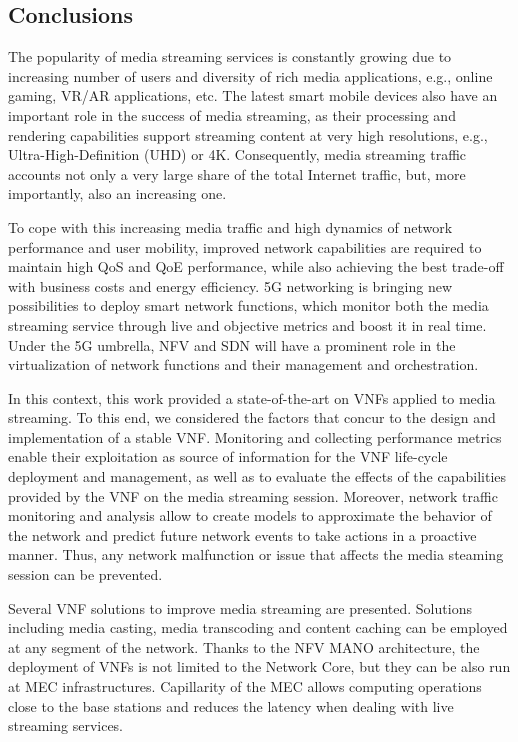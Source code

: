 \subsection{Conclusions}
\label{sec:IEEECOMSTconclusion}

The popularity of media streaming services is constantly growing due to increasing number of users and diversity of rich media applications, e.g., online gaming, VR/AR applications, etc. The latest smart mobile devices also have an important role in the success of media streaming, as their processing and rendering capabilities support streaming content at very high resolutions, e.g., Ultra-High-Definition (UHD) or 4K. Consequently, media streaming traffic accounts not only a very large share of the total Internet traffic, but, more importantly, also an increasing one.

To cope with this increasing media traffic and high dynamics of network performance and user mobility, improved network capabilities are required to maintain high QoS and QoE performance, while also achieving the best trade-off with business costs and energy efficiency. 5G networking is bringing new possibilities to deploy smart network functions, which monitor both the media streaming service through live and objective metrics and boost it in real time. Under the 5G umbrella, NFV and SDN will have a prominent role in the virtualization of network functions and their management and orchestration.

In this context, this work provided a state-of-the-art on VNFs applied to media streaming. To this end, we considered the factors that concur to the design and implementation of a stable VNF. Monitoring and collecting performance metrics enable their exploitation as source of information for the VNF life-cycle deployment and management, as well as to evaluate the effects of the capabilities provided by the VNF on the media streaming session. Moreover, network traffic monitoring and analysis allow to create models to approximate the behavior of the network and predict future network events to take actions in a proactive manner. Thus, any network malfunction or issue that affects the media steaming session can be prevented.

Several VNF solutions to improve media streaming are presented. Solutions including media casting, media transcoding and content caching can be employed at any segment of the network. Thanks to the NFV MANO architecture, the deployment of VNFs is not limited to the Network Core, but they can be also run at MEC infrastructures. Capillarity of the MEC allows computing operations close to the base stations and reduces the latency when dealing with live streaming services.

